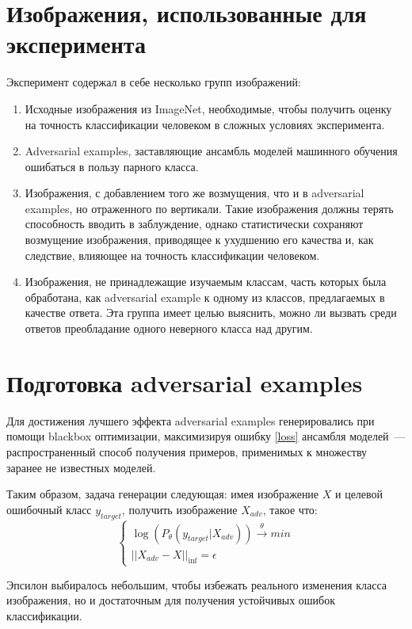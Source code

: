 \documentclass[a4paper,12pt]{article}
\begin{document}
\section{Изображения, использованные для эксперимента}
Эксперимент содержал в себе несколько групп изображений: 
\begin{enumerate}
    \item Исходные изображения из ImageNet, необходимые, чтобы получить оценку на точность классификации человеком в сложных условиях эксперимента.
    \item Adversarial examples, заставляющие ансамбль моделей машинного обучения ошибаться в пользу парного класса.
    \item Изображения, с добавлением того же возмущения, что и в adversarial examples, но отраженного по вертикали. Такие изображения должны терять способность вводить в заблуждение, однако статистически сохраняют возмущение изображения, приводящее к ухудшению его качества и, как следствие, влияющее на точность классификации человеком.
    \item Изображения, не принадлежащие изучаемым классам, часть которых была обработана, как adversarial example к одному из классов, предлагаемых в качестве ответа. Эта группа имеет целью выяснить, можно ли вызвать среди ответов преобладание одного неверного класса над другим.
\end{enumerate}

\section{Подготовка adversarial examples}
Для достижения лучшего эффекта adversarial examples генерировались при помощи blackbox оптимизации, максимизируя ошибку \ref{loss} ансамбля моделей~--- распространенный способ получения примеров, применимых к множеству заранее не известных моделей.

Таким образом, задача генерации следующая: имея изображение $X$ и целевой ошибочный класс $y_{target}$, получить изображение $X_{adv}$, такое что:
\begin{equation}
\label{loss}
    \begin{cases}
    \log(P_{\theta} (y_{target} | X_{adv} )) \overset{\theta}{\rightarrow} min\\
    ||X_{adv} - X||_{\inf} = \epsilon
    \end{cases}
\end{equation}

Эпсилон выбиралось небольшим, чтобы избежать реального изменения класса изображения, но и достаточным для получения устойчивых ошибок классификации.
\end{document}
